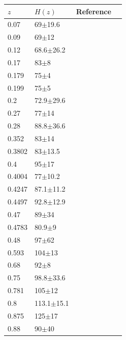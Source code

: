 \documentclass[twocolumn]{aastex631}
\begin{document}
   \begin{table}[htbp]
      \centering
      \begin{tabular}{llll}
         \hline\hline
         $z$ & $H(z)$ & Reference \\
         \hline     
         0.07 & 69$\pm$19.6 & \cite{Zhang_2014} \\
         0.09 & 69$\pm$12 & \cite{PhysRevD.71.123001} \\
         0.12 & 68.6$\pm$26.2 & \cite{Zhang_2014} \\
         0.17 & 83$\pm$8 & \cite{PhysRevD.71.123001} \\
         0.179 & 75$\pm$4 & \cite{M.Moresco_2012} \\
         0.199 & 75$\pm$5 & \cite{M.Moresco_2012} \\
         0.2 & 72.9$\pm$29.6 & \cite{Zhang_2014} \\
         0.27 & 77$\pm$14 & \cite{PhysRevD.71.123001} \\
         0.28 & 88.8$\pm$36.6 & \cite{Zhang_2014} \\
         0.352 & 83$\pm$14 & \cite{M.Moresco_2012} \\
         0.3802 & 83$\pm$13.5 & \cite{Moresco_2016}  \\
         0.4 & 95$\pm$17 & \cite{PhysRevD.71.123001} \\
         0.4004 & 77$\pm$10.2 & \cite{Moresco_2016} \\
         0.4247 & 87.1$\pm$11.2 & \cite{Moresco_2016} \\
         0.4497 & 92.8$\pm$12.9 & \cite{Moresco_2016} \\
         0.47 & 89$\pm$34 & \cite{10.1093/mnras/stx301} \\
         0.4783 & 80.9$\pm$9 & \cite{Moresco_2016} \\
         0.48 & 97$\pm$62 & \cite{Daniel.Stern_2010} \\
         0.593 & 104$\pm$13 & \cite{M.Moresco_2012} \\
         0.68 & 92$\pm$8 & \cite{M.Moresco_2012} \\
         0.75 & 98.8$\pm$33.6 & \cite{Borghi_2022} \\
         0.781 & 105$\pm$12 & \cite{M.Moresco_2012} \\
         0.8 & 113.1$\pm$15.1 & \cite{Jiao_2023} \\
         0.875 & 125$\pm$17 & \cite{M.Moresco_2012} \\
         0.88 & 90$\pm$40 & \cite{Daniel.Stern_2010} \\

\end{tabular}
\end{table}
\end{document}

